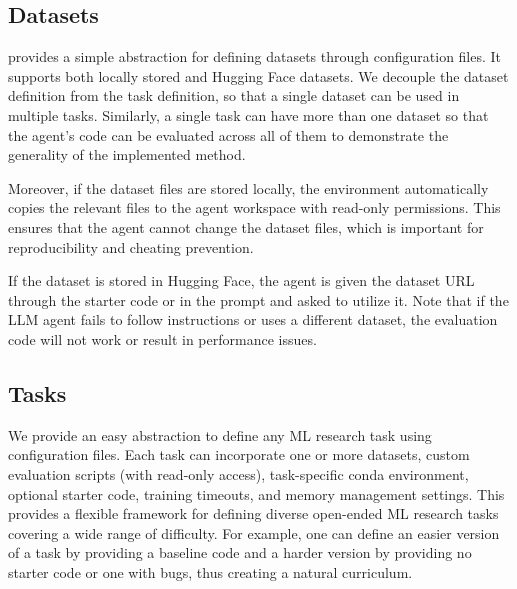 \subsection{Datasets} 
\label{sec:datasets}
\mlgym provides a simple abstraction for defining datasets through configuration files.
%
It supports both locally stored and Hugging Face datasets.
%
We decouple the dataset definition from the task definition, so that a single dataset can be used in multiple tasks. Similarly, a single task can have more than one dataset so that the agent's code can be evaluated across all of them to demonstrate the generality of the implemented method.

Moreover, if the dataset files are stored locally, the environment automatically copies the relevant files to the agent workspace with read-only permissions.
%
This ensures that the agent cannot change the dataset files, which is important for reproducibility and cheating prevention.

If the dataset is stored in Hugging Face, the agent is given the dataset URL through the starter code or in the prompt and asked to utilize it. 
%
Note that if the LLM agent fails to follow instructions or uses a different dataset, the evaluation code will not work or result in performance issues.

\subsection{Tasks}
\label{sec:tasks}
We provide an easy abstraction to define any ML research task using configuration files.
%
Each task can incorporate one or more datasets, custom evaluation scripts (with read-only access), task-specific conda environment, optional starter code, training timeouts, and memory management settings.
%
This provides a flexible framework for defining diverse open-ended ML research tasks covering a wide range of difficulty. For example, one can define an easier version of a task by providing a baseline code and a harder version by providing no starter code or one with bugs, thus creating a natural curriculum.

